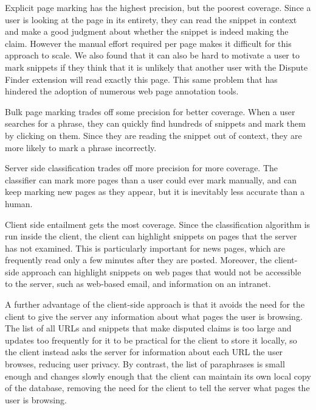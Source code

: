 \documentclass{www2010-submission}
\begin{document}
Explicit page marking has the highest precision, but the poorest coverage. Since a user is looking at the page in its entirety, they can read the snippet in context and make a good judgment about whether the snippet is indeed making the claim. However the manual effort required per page makes it difficult for this approach to scale. We also found that it can also be hard to motivate a user to mark snippets if they think that it is unlikely that another user with the Dispute Finder extension will read exactly this page. This same problem that has hindered the adoption of numerous web page annotation tools.

Bulk page marking trades off some precision for better coverage. When a user searches for a phrase, they can quickly find hundreds of snippets and mark them by clicking on them. Since they are reading the snippet out of context, they are more likely to mark a phrase incorrectly. 

Server side classification trades off more precision for more coverage. The classifier can mark more pages than a user could ever mark manually, and can keep marking new pages as they appear, but it is inevitably less accurate than a human.

Client side entailment gets the most coverage. Since the classification algorithm is run inside the client, the client can highlight snippets on pages that the server has not examined. This is particularly important for news pages, which are frequently read only a few minutes after they are posted. Moreover, the client-side approach can highlight snippets on web pages that would not be accessible to the server, such as web-based email, and information on an intranet. 

A further advantage of the client-side approach is that it avoids the need for the client to give the server any information about what pages the user is browsing. The list of all URLs and snippets that make disputed claims is too large and updates too frequently for it to be practical for the client to store it locally, so the client instead asks the server for information about each URL the user browses, reducing user privacy. By contrast, the list of paraphrases is small enough and changes slowly enough that the client can maintain its own local copy of the database, removing the need for the client to tell the server what pages the user is browsing.
\end{document}
